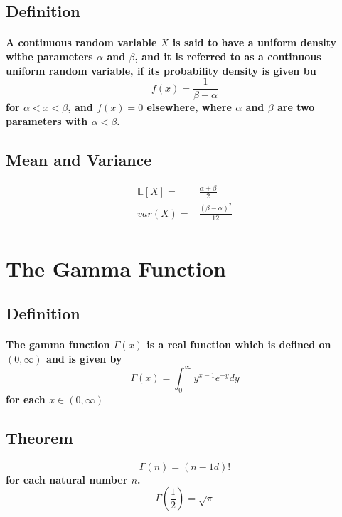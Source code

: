 \documentclass[titlepage]{article}
\begin{document}
        \subsection*{Definition}
            \paragraph{
                A continuous random variable $X$ is said to have a uniform density withe parameters $\alpha$ and $\beta$, and it is referred to as a continuous uniform random variable, if its probability density is given bu
                $$f(x)=\frac{1}{\beta-\alpha}$$ 
                for $\alpha<x<\beta$, and $f(x)=0$ elsewhere, where $\alpha$ and $\beta$ are two parameters with $\alpha<\beta$.
            }
        \subsection*{Mean and Variance}
            \begin{equation*}
                \begin{split}
                    \mathbb{E}[X]=&\frac{\alpha+\beta}{2}\\
                    var(X)=&\frac{(\beta-\alpha)^2}{12}\\
                \end{split}
            \end{equation*}
    \section{The Gamma Function}
        \subsection*{Definition}
            \paragraph{
                The gamma function $\Gamma(x)$ is a real function which is defined on $(0,\infty)$ and is given by
                $$\Gamma(x)=\int_0^\infty y^{x-1}e^{-y}dy$$
                for each $x\in (0,\infty)$
            }
        \subsection*{Theorem}
            \paragraph{
                $$\Gamma(n)=(n-1d)!$$
                for each natural number $n$.
                $$\Gamma(\frac{1}{2})=\sqrt{\pi}$$
            }
\end{document}
